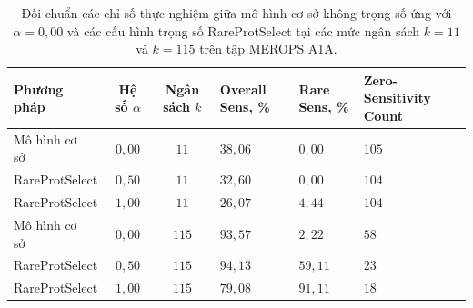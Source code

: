 \begin{table}[htbp!]
    \centering
    \caption{Đối chuẩn các chỉ số thực nghiệm giữa mô hình cơ sở không trọng số ứng với $\alpha = 0{,}00$ và các cấu hình trọng số RareProtSelect tại các mức ngân sách $k = 11$ và $k = 115$ trên tập MEROPS A1A.}
    \label{tab:exp2_pareto_milestones}
    \vspace{2pt}
    \renewcommand{\arraystretch}{0.92}
    \begin{tabularx}{\textwidth}{L{3.5cm} c c >{\centering\arraybackslash}p{2.2cm} >{\centering\arraybackslash}p{2.2cm} >{\centering\arraybackslash}X}
        \toprule
        \textbf{Phương pháp} & \textbf{Hệ số $\alpha$} & \textbf{Ngân sách $k$} & \textbf{Overall Sens, \%} & \textbf{Rare Sens, \%} & \textbf{Zero-Sensitivity Count} \\
        \midrule
        Mô hình cơ sở~\cite{nguyen2025} & $0{,}00$ & $11$ & $38{,}06$ & $0{,}00$ & $105$ \\
        RareProtSelect & $0{,}50$ & $11$ & $32{,}60$ & $0{,}00$ & $104$ \\
        RareProtSelect & $1{,}00$ & $11$ & $26{,}07$ & $4{,}44$ & $104$ \\
        \midrule
        Mô hình cơ sở~\cite{nguyen2025} & $0{,}00$ & $115$ & $93{,}57$ & $2{,}22$ & $58$ \\
        RareProtSelect & $0{,}50$ & $115$ & $94{,}13$ & $59{,}11$ & $23$ \\
        RareProtSelect & $1{,}00$ & $115$ & $79{,}08$ & $91{,}11$ & $18$ \\
        \bottomrule
    \end{tabularx}
\end{table}

